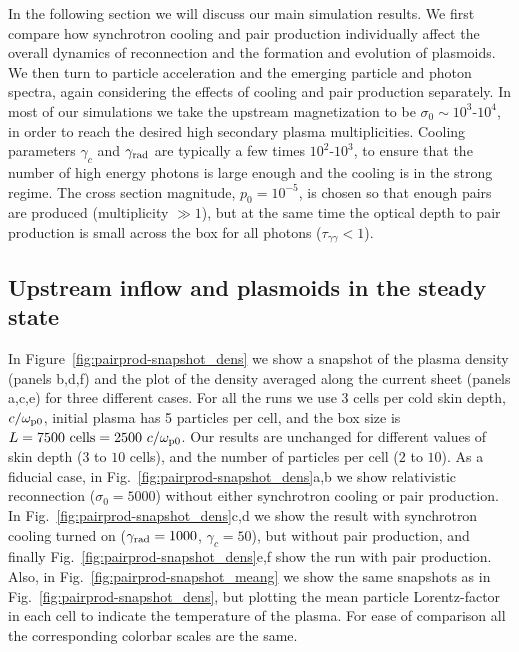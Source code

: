
In the following section we will discuss our main simulation results. We first compare how synchrotron cooling and pair production individually affect the overall dynamics of reconnection and the formation and evolution of plasmoids. We then turn to particle acceleration and the emerging particle and photon spectra, again considering the effects of cooling and pair production separately. In most of our simulations we take the upstream magnetization to be $\sigma_0\sim 10^3\text{-}10^4$, in order to reach the desired high secondary plasma multiplicities. Cooling parameters $\gamma_c$ and $\gamma_{\rm rad}$ are typically a few times $10^2\text{-}10^3$, to ensure that the number of high energy photons is large enough and the cooling is in the strong regime. The cross section magnitude, $p_0=10^{-5}$, is chosen so that enough pairs are produced (multiplicity $\gg 1$), but at the same time the optical depth to pair production is small across the box for all photons ($\tau_{\gamma\gamma}<1$).

\subsection*{Upstream inflow and plasmoids in the steady state}

In Figure~\ref{fig:pairprod-snapshot_dens} we show a snapshot of the plasma density (panels b,d,f) and the plot of the density averaged along the current sheet (panels a,c,e) for three different cases. For all the runs we use 3 cells per cold skin depth, $c/\omega_{\rm p0}$, initial plasma has 5 particles per cell, and the box size is  $L=7500~\text{cells}=2500~c/\omega_{\rm p0}$. Our results are unchanged for different values of skin depth ($3$ to $10$ cells), and the number of particles per cell ($2$ to $10$). As a fiducial case, in Fig.~\ref{fig:pairprod-snapshot_dens}a,b we show relativistic reconnection ($\sigma_0=5000$) without either synchrotron cooling or pair production. In Fig.~\ref{fig:pairprod-snapshot_dens}c,d we show the result with synchrotron cooling turned on ($\gamma_{\rm rad}=1000$, $\gamma_c=50$), but without pair production, and finally Fig.~\ref{fig:pairprod-snapshot_dens}e,f show the run with pair production. Also, in Fig.~\ref{fig:pairprod-snapshot_meang} we show the same snapshots as in Fig.~\ref{fig:pairprod-snapshot_dens}, but plotting the mean particle Lorentz-factor in each cell to indicate the temperature of the plasma. For ease of comparison all the corresponding colorbar scales are the same.

